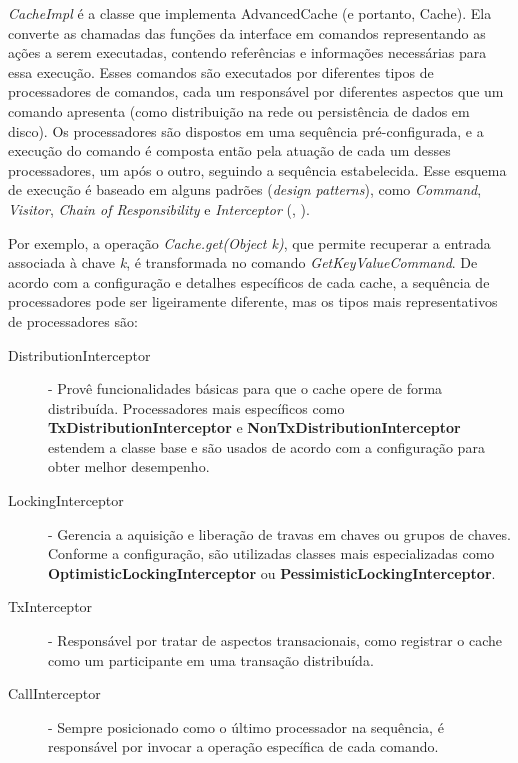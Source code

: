 \documentclass[11pt,twoside,a4paper]{book}
\begin{document}
\emph{CacheImpl} é a classe que implementa AdvancedCache (e portanto, Cache). Ela converte as chamadas das funções da interface em comandos representando as ações a serem executadas, contendo referências e informações necessárias para essa execução. Esses comandos são executados por diferentes tipos de processadores de comandos, cada um responsável por diferentes aspectos que um comando apresenta (como distribuição na rede ou persistência de dados em disco). Os processadores são dispostos em uma sequência pré-configurada, e a execução do comando é composta então pela atuação de cada um desses processadores, um após o outro, seguindo a sequência estabelecida. Esse esquema de execução é baseado em alguns padrões (\emph{design patterns}), como \emph{Command}, \emph{Visitor}, \emph{Chain of Responsibility} e \emph{Interceptor} (\cite{design_patterns}, \cite{posa}).

Por exemplo, a operação \emph{Cache.get(Object k)}, que permite recuperar a entrada associada à chave \emph{k}, é transformada no comando \emph{GetKeyValueCommand}. De acordo com a configuração e detalhes específicos de cada cache, a sequência de processadores pode ser ligeiramente diferente, mas os tipos mais representativos de processadores são:

\begin{description} 
	\item[DistributionInterceptor] - Provê funcionalidades básicas para que o cache opere de forma distribuída. Processadores mais específicos como \textbf{TxDistributionInterceptor} e \textbf{NonTxDistributionInterceptor} estendem a classe base e são usados de acordo com a configuração para obter melhor desempenho.
	\item[LockingInterceptor] - Gerencia a aquisição e liberação de travas em chaves ou grupos de chaves. Conforme a configuração, são utilizadas classes mais especializadas como \textbf{OptimisticLockingInterceptor} ou \textbf{PessimisticLockingInterceptor}.
	\item[TxInterceptor] - Responsável por tratar de aspectos transacionais, como registrar o cache como um participante em uma transação distribuída.
	\item[CallInterceptor] - Sempre posicionado como o último processador na sequência, é responsável por invocar a operação específica de cada comando.
\end{description}
\end{document}

